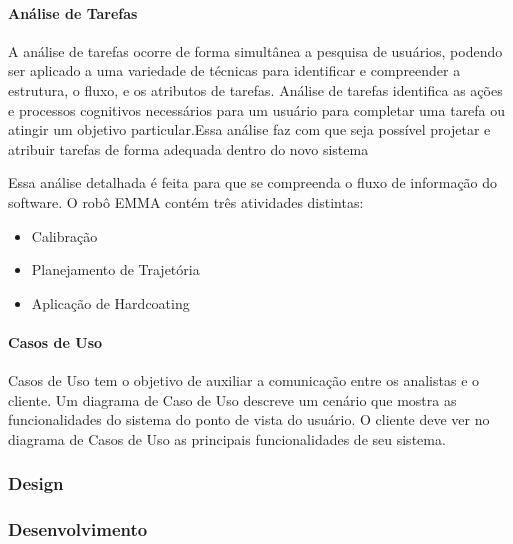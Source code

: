 \paragraph{Análise de Tarefas}
A análise de tarefas ocorre de forma simultânea a pesquisa de usuários, podendo
ser aplicado a uma variedade de técnicas para identificar e compreender a estrutura, o fluxo, 
e os atributos de tarefas. Análise de tarefas identifica as ações e processos cognitivos 
necessários para um usuário para completar uma tarefa ou atingir um objetivo
particular.Essa análise faz com que seja possível projetar e atribuir tarefas de
forma adequada dentro do novo sistema

Essa análise detalhada é feita para que se compreenda o fluxo de informação do
software. O robô EMMA contém três atividades distintas:

\begin{itemize}
  \item Calibração
  \item Planejamento de Trajetória
  \item Aplicação de Hardcoating
\end{itemize}

\paragraph{Casos de Uso}
Casos de Uso tem o objetivo de auxiliar a comunicação entre os
analistas e o cliente.
Um diagrama de Caso de Uso descreve um cenário que mostra as funcionalidades do sistema do ponto de vista do usuário. 
O cliente deve ver no diagrama de Casos de Uso as principais funcionalidades de seu sistema.




\subsubsection{Design}

\subsubsection{Desenvolvimento}





